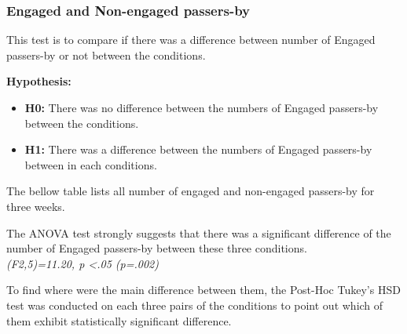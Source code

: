 \subsubsection {Engaged and Non-engaged passers-by}
This test is to compare if there was a difference between number of Engaged passers-by or not between the conditions.

\textbf{Hypothesis: }
\begin{itemize}
\item \textbf{H0:} There was no difference between the numbers of Engaged passers-by between the conditions.
\item \textbf{H1:} There was a difference between the numbers of Engaged passers-by between in each conditions.
\end{itemize}

The bellow table lists all number of engaged and non-engaged passers-by for three weeks.


\begin{table}[H]
\caption{Number of engaged passers-by in three weeks}
\label{tab:engagedofthreeweeks}
\centering
{}
\end{table}

The ANOVA test strongly suggests that there was a significant difference of the number of Engaged passers-by between these three conditions.\\
 \emph{(F2,5)=11.20, p <.05 (p=.002)}

To find where were the main difference between them, the Post-Hoc Tukey’s HSD test was conducted on each three pairs of the conditions to point out which of them exhibit statistically significant difference. 


